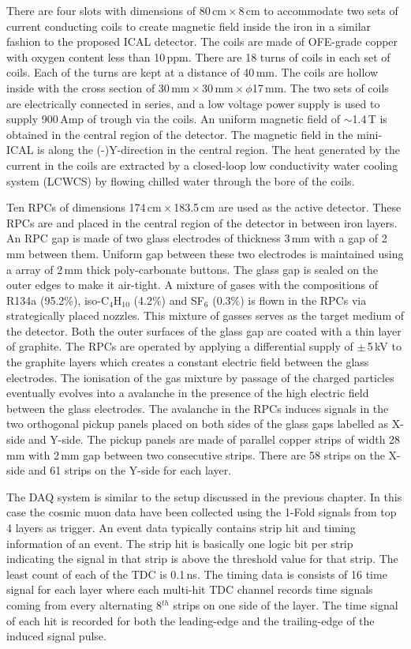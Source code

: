 There are four slots with dimensions of 80\,cm\,$\times$\,8\,cm to
accommodate two sets of current conducting coils to create magnetic
field inside the iron in a similar fashion to the proposed
ICAL detector. The coils are made of OFE-grade copper with
oxygen content less than 10\,ppm. There are 18 turns of coils in each
set of coils. Each of the turns are kept at a distance of 40\,mm.
The coils are hollow inside with the cross section of
30\,mm\,$\times$\,30\,mm\,$\times$\,$\phi$17\,mm.
The two sets of coils are electrically connected in series,
and a low voltage power supply is used to supply 900\,Amp
of trough via the coils. An uniform magnetic field of $\sim$1.4\,T
is obtained in the central region of the detector. The magnetic field
in the mini-ICAL is along the (-)Y-direction in the central region.
The heat generated by the current in the
coils are extracted by a closed-loop low conductivity water cooling
system (LCWCS) by flowing chilled water through the bore of the coils.

Ten RPCs of dimensions 174\,cm\,$\times$\,183.5\,cm are used as the
active detector. These RPCs are and placed in the central region of
the detector in between iron layers.
An RPC gap is made of two glass electrodes of thickness 3\,mm with
a gap of 2\,mm between them. Uniform gap between these two electrodes
is maintained using a array of 2\,mm thick poly-carbonate buttons.
The glass gap is sealed on the outer edges to make it air-tight.
A mixture of gases with the compositions of R134a (95.2\%),
iso-C$_4$H$_{10}$ (4.2\%) and SF$_6$ (0.3\%) is flown in the RPCs
via strategically placed nozzles. This mixture of gasses serves as the
target medium of the detector.
Both the outer surfaces of the glass gap are coated with a thin layer
of graphite. The RPCs are operated by applying a differential supply of
$\pm$\,5\,kV to the graphite layers which creates a constant electric
field between the glass electrodes. The ionisation of the gas mixture
by passage of the charged particles eventually evolves into a
avalanche in the presence of the high electric field between the glass
electrodes. The avalanche in the RPCs induces signals in the two
orthogonal pickup panels placed on both sides of the glass gaps
labelled as X-side and Y-side. The pickup panels are made of parallel
copper strips of width 28\,mm with 2\,mm gap between two consecutive
strips. There are 58 strips on the X-side and 61 strips on the
Y-side for each layer.

The DAQ system is similar to the setup discussed in the previous
chapter. In this case the cosmic muon data have been collected using
the 1-Fold signals from top 4 layers as trigger.
An event data typically contains strip hit and timing information
of an event. The strip hit is basically one logic bit per strip
indicating the signal in that strip is above the threshold value
for that strip. The least count of each of the TDC is 0.1\,ns.
The timing data is consists of 16 time signal for
each layer where each multi-hit TDC channel records time signals
coming from every alternating 8$^{th}$ strips on one side of the layer.
The time signal of each hit is recorded for both the leading-edge and
the trailing-edge of the induced signal pulse.



